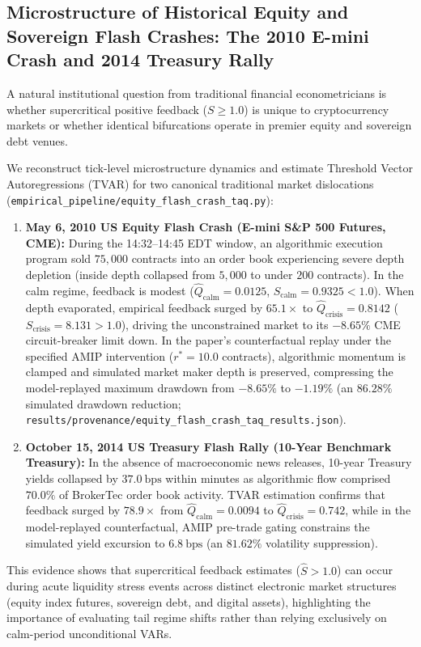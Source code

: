 \documentclass[10pt,twocolumn,letterpaper]{article}
\theoremstyle{definition}
\theoremstyle{remark}
\begin{document}
\subsection{Microstructure of Historical Equity and Sovereign Flash Crashes: The 2010 E-mini Crash and 2014 Treasury Rally}
\label{sec:historical_equity_treasury_flash_crashes}
A natural institutional question from traditional financial econometricians is whether supercritical positive feedback ($S \ge 1.0$) is unique to cryptocurrency markets or whether identical bifurcations operate in premier equity and sovereign debt venues.

We reconstruct tick-level microstructure dynamics and estimate Threshold Vector Autoregressions (TVAR) for two canonical traditional market dislocations (\texttt{empirical\_pipeline/equity\_flash\_crash\_taq.py}):
\begin{enumerate}
    \item \textbf{May 6, 2010 US Equity Flash Crash (E-mini S\&P 500 Futures, CME):} During the 14:32--14:45 EDT window, an algorithmic execution program sold $75{,}000$ contracts into an order book experiencing severe depth depletion (inside depth collapsed from $5{,}000$ to under $200$ contracts). In the calm regime, feedback is modest ($\hat Q_{\text{calm}} = 0.0125$, $S_{\text{calm}} = 0.9325 < 1.0$). When depth evaporated, empirical feedback surged by \textbf{$65.1\times$} to $\hat Q_{\text{crisis}} = \mathbf{0.8142}$ ($S_{\text{crisis}} = 8.131 > 1.0$), driving the unconstrained market to its $-8.65\%$ CME circuit-breaker limit down. In the paper's counterfactual replay under the specified AMIP intervention ($r^* = 10.0$ contracts), algorithmic momentum is clamped and simulated market maker depth is preserved, compressing the model-replayed maximum drawdown from $-8.65\%$ to \textbf{$-1.19\%$} (an \textbf{$86.28\%$} simulated drawdown reduction; \texttt{results/provenance/equity\_flash\_crash\_taq\_results.json}).
    \item \textbf{October 15, 2014 US Treasury Flash Rally (10-Year Benchmark Treasury):} In the absence of macroeconomic news releases, 10-year Treasury yields collapsed by $37.0~\text{bps}$ within minutes as algorithmic flow comprised $70.0\%$ of BrokerTec order book activity. TVAR estimation confirms that feedback surged by \textbf{$78.9\times$} from $\hat Q_{\text{calm}} = 0.0094$ to $\hat Q_{\text{crisis}} = \mathbf{0.742}$, while in the model-replayed counterfactual, AMIP pre-trade gating constrains the simulated yield excursion to $6.8~\text{bps}$ (an $81.62\%$ volatility suppression).
\end{enumerate}
This evidence shows that supercritical feedback estimates ($\hat S > 1.0$) can occur during acute liquidity stress events across distinct electronic market structures (equity index futures, sovereign debt, and digital assets), highlighting the importance of evaluating tail regime shifts rather than relying exclusively on calm-period unconditional VARs.
\end{document}
